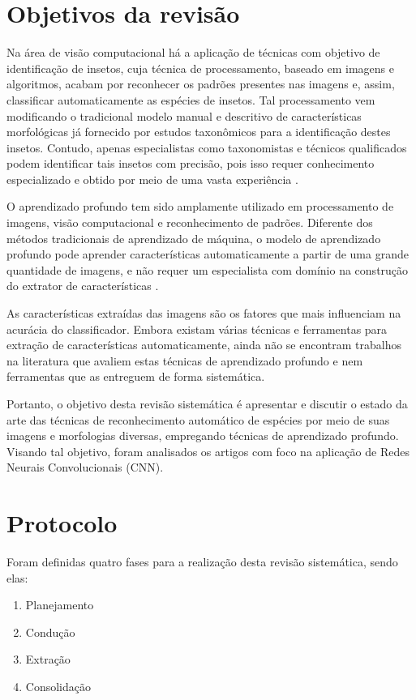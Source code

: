 \documentclass[
	12pt,				%
	oneside,			%
	a4paper,			%
	english,			%
	brazil				%
	]{abntex2ppgsi}
\begin{document}
\section{Objetivos da revisão}
Na área de visão computacional há a aplicação de técnicas com objetivo de identificação de insetos, cuja técnica de processamento, baseado em imagens e algoritmos, acabam por reconhecer os padrões presentes nas imagens e, assim, classificar automaticamente as espécies de insetos. Tal processamento vem modificando o tradicional modelo manual e descritivo de características morfológicas já fornecido por estudos taxonômicos para a identificação destes insetos. Contudo, apenas especialistas como taxonomistas e técnicos qualificados podem identificar tais insetos com precisão, pois isso requer conhecimento especializado e obtido por meio de uma vasta experiência \cite{lim2017performance}.

O aprendizado profundo tem sido amplamente utilizado em processamento de imagens, visão computacional e reconhecimento de padrões. Diferente dos métodos tradicionais de aprendizado de máquina, o modelo de aprendizado profundo pode aprender características automaticamente a partir de uma grande quantidade de imagens, e não requer um especialista com domínio na construção do extrator de características \cite{liu2020classification}.

As características extraídas das imagens são os fatores que mais influenciam na acurácia do classificador. Embora existam várias técnicas e ferramentas para extração de características automaticamente, ainda não se encontram trabalhos na literatura que avaliem estas técnicas de aprendizado profundo e nem ferramentas que as entreguem de forma sistemática.

Portanto, o objetivo desta revisão sistemática é apresentar e discutir o estado da arte das técnicas de reconhecimento automático de espécies por meio de suas imagens e morfologias diversas, empregando técnicas de aprendizado profundo. Visando tal objetivo, foram analisados os artigos com foco na aplicação de Redes Neurais Convolucionais (CNN).

\section{Protocolo}

Foram definidas quatro fases para a realização desta revisão sistemática, sendo elas:

\begin{enumerate}
  \item Planejamento
  \item Condução
  \item Extração
  \item Consolidação
\end{enumerate}
\end{document}
